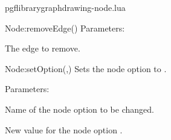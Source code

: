 \begin{filedescription}{pgflibrarygraphdrawing-node.lua}
\begin{luacommand}{{Node:removeEdge}()}
Parameters:
\begin{parameterdescription}
	\item[\meta{edge}] The edge to remove. 
\end{parameterdescription}



\end{luacommand}\begin{luacommand}{{Node:setOption}(,)}
Sets the node option  to . 

Parameters:
\begin{parameterdescription}
	\item[\meta{name}] Name of the node option to be changed.\item[\meta{value}] New value for the node option . 
\end{parameterdescription}



\end{luacommand}
\end{filedescription}